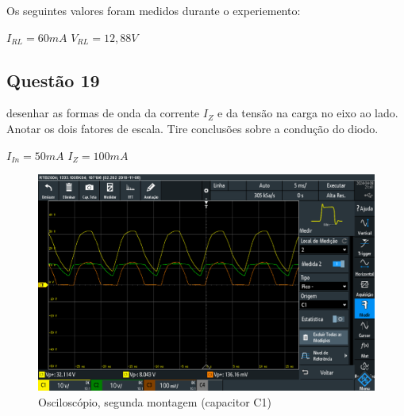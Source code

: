 \documentclass{article}
\begin{document}
Os seguintes valores foram medidos durante o experiemento:

\begin{center}
    \begin{tcolorbox}[width=0.6\textwidth]
        \centering
        $I_{RL} = 60mA$
        \hspace{2cm}
        $V_{RL} = 12,88V$
    \end{tcolorbox}
\end{center}

\subsection{Questão 19}

\begin{tcolorbox}[title=\large Questão 19, colback=red!5!white, colframe=red!75!black]
    \large
    desenhar as formas de onda da corrente $I_Z$ e da tensão na carga no eixo ao lado. Anotar os dois fatores de escala. Tire conclusões sobre a condução do diodo.
\end{tcolorbox}

\begin{center}
    \begin{tcolorbox}[width=0.4\textwidth, title=\large Fatores de escala (Ampere/div)]
        \centering
        $I_{In} = 50mA$
        \hspace{2cm}
        $I_{Z} = 100mA$
    \end{tcolorbox}
\end{center}

\begin{figure}[h!]
    \centering
    \includegraphics[width=12cm]{images/SCR08.PNG}
    \caption{Osciloscópio, segunda montagem (capacitor C1)}
\end{figure}
\end{document}
